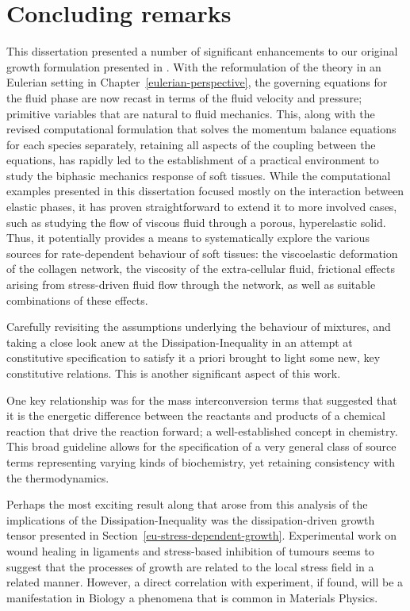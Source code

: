 \chapter{Concluding remarks}
\label{conclusions}

\vspace{0.5cm} %

This dissertation presented a number of significant enhancements to
our original growth formulation presented in \citet{growthpaper}.
With the reformulation of the theory in an Eulerian setting in
Chapter~\ref{eulerian-perspective}, the governing equations for the
fluid phase are now recast in terms of the fluid velocity and
pressure; primitive variables that are natural to fluid
mechanics. This, along with the revised computational formulation that
solves the momentum balance equations for each species separately,
retaining all aspects of the coupling between the equations, has
rapidly led to the establishment of a practical environment to study
the biphasic mechanics response of soft tissues. While the
computational examples presented in this dissertation focused mostly
on the interaction between elastic phases, it has proven
straightforward to extend it to more involved cases, such as studying
the flow of viscous fluid through a porous, hyperelastic solid. Thus,
it potentially provides a means to systematically explore the various
sources for rate-dependent behaviour of soft tissues:  the
viscoelastic deformation of the collagen network, the viscosity of the
extra-cellular fluid, frictional effects arising from stress-driven
fluid flow through the network, as well as suitable combinations of
these effects.

Carefully revisiting the assumptions underlying the behaviour of
mixtures, and taking a close look anew at the Dissipation-Inequality
in an attempt at constitutive specification to satisfy it a priori
brought to light some new, key constitutive relations. This is another
significant aspect of this work.

One key relationship was for the mass interconversion terms that
suggested that it is the energetic difference between the reactants
and products of a chemical reaction that drive the reaction forward; a
well-established concept in chemistry. This broad guideline allows for
the specification of a very general class of source terms representing
varying kinds of biochemistry, yet retaining consistency with the
thermodynamics.

Perhaps the most exciting result along that arose from this analysis
of the implications of the Dissipation-Inequality was the
dissipation-driven growth tensor presented in
Section~\ref{eu-stress-dependent-growth}. Experimental work on wound
healing in ligaments \citep{Provenzanoetal:2003} and stress-based 
inhibition of tumours \citep{jain1997} seems to suggest that the
processes of growth are related to the local stress field in a
related manner. However, a direct correlation with experiment, if
found, will be a manifestation in Biology a phenomena that is common in
Materials Physics.

%

